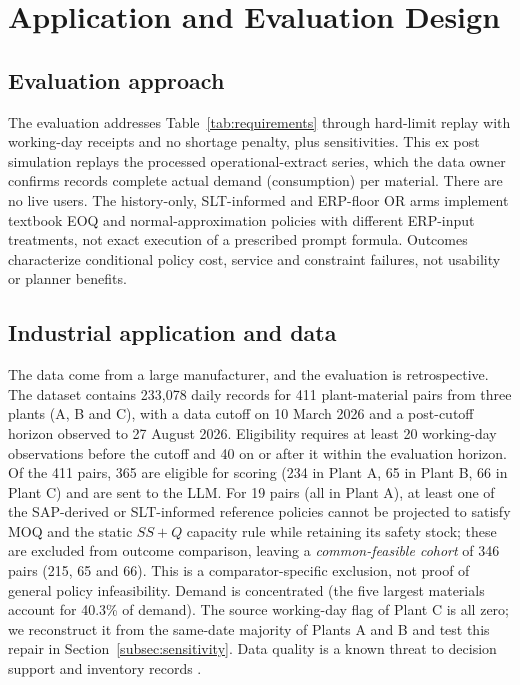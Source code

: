\documentclass[preprint,12pt,nonatbib]{elsarticle}
\let\cite\parencite
\begin{document}
\section{Application and Evaluation Design}
\label{sec:design}

\subsection{Evaluation approach}
\label{subsec:evalapproach}
The evaluation addresses Table~\ref{tab:requirements} through hard-limit replay with working-day receipts and no shortage penalty, plus sensitivities. This ex post simulation replays the processed operational-extract series, which the data owner confirms records complete actual demand (consumption) per material. There are no live users. The history-only, SLT-informed and ERP-floor OR arms implement textbook EOQ and normal-approximation policies with different ERP-input treatments, not exact execution of a prescribed prompt formula. Outcomes characterize conditional policy cost, service and constraint failures, not usability or planner benefits.

\subsection{Industrial application and data}\label{subsec:data}
The data come from a large manufacturer, and the evaluation is retrospective. The dataset contains 233{,}078 daily records for 411 plant-material pairs from three plants (A, B and C), with a data cutoff on 10 March 2026 and a post-cutoff horizon observed to 27 August 2026. Eligibility requires at least 20 working-day observations before the cutoff and 40 on or after it within the evaluation horizon. Of the 411 pairs, 365 are eligible for scoring (234 in Plant A, 65 in Plant B, 66 in Plant C) and are sent to the LLM. For 19 pairs (all in Plant A), at least one of the SAP-derived or SLT-informed reference policies cannot be projected to satisfy MOQ and the static $SS+Q$ capacity rule while retaining its safety stock; these are excluded from outcome comparison, leaving a \emph{common-feasible cohort} of 346 pairs (215, 65 and 66). This is a comparator-specific exclusion, not proof of general policy infeasibility. Demand is concentrated (the five largest materials account for 40.3\% of demand). The source working-day flag of Plant C is all zero; we reconstruct it from the same-date majority of Plants A and B and test this repair in Section~\ref{subsec:sensitivity}. Data quality is a known threat to decision support \cite{watts2009data} and inventory records \cite{dehoratius2008inventory, kang2005information, mersereau2013information}.
\end{document}
